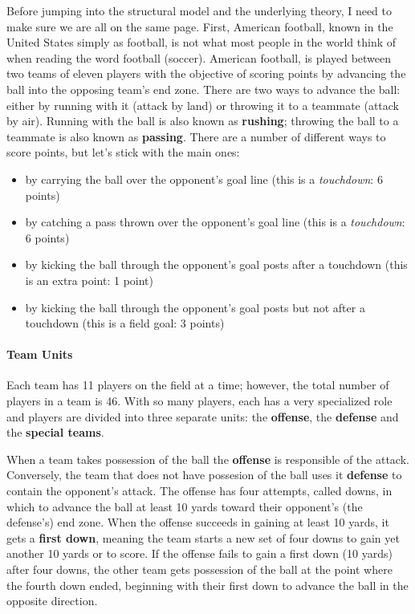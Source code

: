 \documentclass[12pt]{book}\usepackage{graphicx, color}
\begin{document}
Before jumping into the structural model and the underlying theory, I need to make sure we are all on the same page. First, American football, known in the United States simply as football, is not what most people in the world think of when reading the word football (soccer). American football, is played between two teams of eleven players with the objective of scoring points by advancing the ball into the opposing team's end zone. There are two ways to advance the ball: either by running with it (attack by land) or throwing it to a teammate (attack by air). Running with the ball is also known as \textbf{rushing}; throwing the ball to a teammate is also known as \textbf{passing}. There are a number of different ways to score points, but let's stick with the main ones:
\begin{itemize}
 \item by carrying the ball over the opponent's goal line (this is a \textit{touchdown}: 6 points)
 \item by catching a pass thrown over the opponent's goal line (this is a \textit{touchdown}: 6 points)
 \item by kicking the ball through the opponent's goal posts after a touchdown (this is an extra point: 1 point)
 \item by kicking the ball through the opponent's goal posts but not after a touchdown (this is a field goal: 3 points)
\end{itemize}

\paragraph{Team Units}
Each team has 11 players on the field at a time; however, the total number of players in a team is 46. With so many players, each has a very specialized role and players are divided into three separate units: the \textbf{offense}, the \textbf{defense} and the \textbf{special teams}. 

When a team takes possession of the ball the \textbf{offense} is responsible of the attack. Conversely, the team that does not have possesion of the ball uses it \textbf{defense} to contain the opponent's attack. The offense has four attempts, called downs, in which to advance the ball at least 10 yards toward their opponent's (the defense's) end zone. When the offense succeeds in gaining at least 10 yards, it gets a \textbf{first down}, meaning the team starts a new set of four downs to gain yet another 10 yards or to score. If the offense fails to gain a first down (10 yards) after four downs, the other team gets possession of the ball at the point where the fourth down ended, beginning with their first down to advance the ball in the opposite direction.
\end{document}
